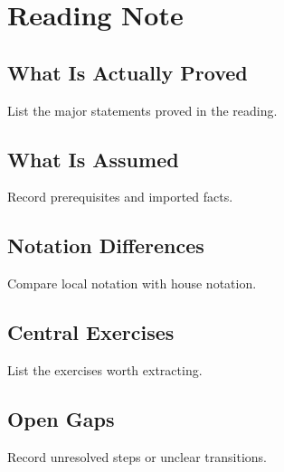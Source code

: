 

\section*{Reading Note}

\subsection*{What Is Actually Proved}

List the major statements proved in the reading.

\subsection*{What Is Assumed}

Record prerequisites and imported facts.

\subsection*{Notation Differences}

Compare local notation with house notation.

\subsection*{Central Exercises}

List the exercises worth extracting.

\subsection*{Open Gaps}

Record unresolved steps or unclear transitions.